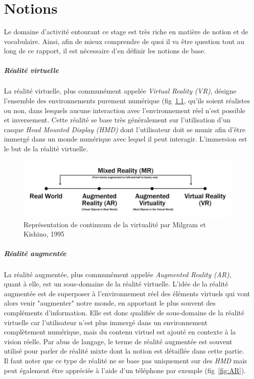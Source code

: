 \newpage
\chapter{Notions}
\label{chap:notions}

Le domaine d'activité entourant ce stage est très riche en matière de notion et de vocabulaire. Ainsi, afin de mieux comprendre de quoi il va être question tout au long de ce rapport, il est nécessaire d'en définir les notions de base.

\paragraph{Réalité virtuelle}
La réalité virtuelle, plus communément appelée \emph{Virtual Reality (VR)}, désigne l'ensemble des environnements purement numérique (fig~\ref{fig:realityspectrum}, qu'ils soient réalistes ou non, dans lesquels aucune interaction avec l'environnement réel n'est possible et inversement. Cette réalité se base très généralement sur l'utilisation d'un casque \emph{Head Mounted Display (HMD)} dont l'utilisateur doit se munir afin d'être immergé dans un monde numérique avec lequel il peut interagir. L'immersion est le but de la réalité virtuelle.

\begin{figure}[H]
\centering
\includegraphics[width=\linewidth]{images/RealitySpectrum}
\caption{Représentation de continuum de la virtualité par Milgram et Kishino, 1995\cite{milgram1995augmented}}
\label{fig:realityspectrum}
\end{figure}

\paragraph{Réalité augmentée}
La réalité augmentée, plus communément appelée \emph{Augmented Reality (AR)}, quant à elle, est un sous-domaine de la réalité virtuelle. L'idée de la réalité augmentée est de superposer à l'environnement réel des éléments virtuels qui vont alors venir "augmenter" notre monde, en apportant le plus souvent des compléments d'information. Elle est donc qualifiée de sous-domaine de la réalité virtuelle car l'utilisateur n'est plus immergé dans un environnement complètement numérique, mais du contenu virtuel est ajouté en contexte à la vision réelle. Par abus de langage, le terme de réalité augmentée est souvent utilisé pour parler de réalité mixte dont la notion est détaillée dans cette partie.
Il faut noter que ce type de réalité ne se base pas uniquement sur des \emph{HMD} mais peut également être appréciée à l'aide d'un téléphone par exemple (fig~\ref{fig:AR}).

